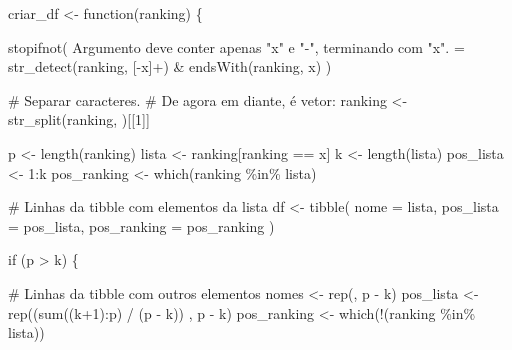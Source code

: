 \documentclass[
  letterpaper,
  DIV=11,
  numbers=noendperiod]{scrreprt}
\newenvironment{Shaded}{\begin{snugshade}}{\end{snugshade}}
\newcommand{\AttributeTok}[1]{\textcolor[rgb]{0.40,0.45,0.13}{#1}}
\newcommand{\CommentTok}[1]{\textcolor[rgb]{0.37,0.37,0.37}{#1}}
\newcommand{\ControlFlowTok}[1]{\textcolor[rgb]{0.00,0.23,0.31}{#1}}
\newcommand{\DecValTok}[1]{\textcolor[rgb]{0.68,0.00,0.00}{#1}}
\newcommand{\FunctionTok}[1]{\textcolor[rgb]{0.28,0.35,0.67}{#1}}
\newcommand{\NormalTok}[1]{\textcolor[rgb]{0.00,0.23,0.31}{#1}}
\newcommand{\OtherTok}[1]{\textcolor[rgb]{0.00,0.23,0.31}{#1}}
\newcommand{\SpecialCharTok}[1]{\textcolor[rgb]{0.37,0.37,0.37}{#1}}
\newcommand{\StringTok}[1]{\textcolor[rgb]{0.13,0.47,0.30}{#1}}
\begin{document}
\begin{Shaded}
\begin{Highlighting}[]
\NormalTok{criar\_df }\OtherTok{\textless{}{-}} \ControlFlowTok{function}\NormalTok{(ranking) \{}
  
  \FunctionTok{stopifnot}\NormalTok{(}
    \StringTok{\textquotesingle{}Argumento deve conter apenas "x" e "{-}", terminando com "x".\textquotesingle{}} \OtherTok{=}
    \FunctionTok{str\_detect}\NormalTok{(ranking, }\StringTok{\textquotesingle{}[{-}x]+\textquotesingle{}}\NormalTok{) }\SpecialCharTok{\&} \FunctionTok{endsWith}\NormalTok{(ranking, }\StringTok{\textquotesingle{}x\textquotesingle{}}\NormalTok{)}
\NormalTok{  )}
  
  \CommentTok{\# Separar caracteres. }
  \CommentTok{\# De agora em diante, é vetor:}
\NormalTok{  ranking }\OtherTok{\textless{}{-}} \FunctionTok{str\_split}\NormalTok{(ranking, }\StringTok{\textquotesingle{}\textquotesingle{}}\NormalTok{)[[}\DecValTok{1}\NormalTok{]]}
  
\NormalTok{  p }\OtherTok{\textless{}{-}} \FunctionTok{length}\NormalTok{(ranking)}
\NormalTok{  lista }\OtherTok{\textless{}{-}}\NormalTok{ ranking[ranking }\SpecialCharTok{==} \StringTok{\textquotesingle{}x\textquotesingle{}}\NormalTok{]}
\NormalTok{  k }\OtherTok{\textless{}{-}} \FunctionTok{length}\NormalTok{(lista)}
\NormalTok{  pos\_lista }\OtherTok{\textless{}{-}} \DecValTok{1}\SpecialCharTok{:}\NormalTok{k}
\NormalTok{  pos\_ranking }\OtherTok{\textless{}{-}} \FunctionTok{which}\NormalTok{(ranking }\SpecialCharTok{\%in\%}\NormalTok{ lista)}
  
  \CommentTok{\# Linhas da tibble com elementos da lista}
\NormalTok{  df }\OtherTok{\textless{}{-}} \FunctionTok{tibble}\NormalTok{(}
    \AttributeTok{nome =}\NormalTok{ lista,}
    \AttributeTok{pos\_lista =}\NormalTok{ pos\_lista,}
    \AttributeTok{pos\_ranking =}\NormalTok{ pos\_ranking}
\NormalTok{  )}
  
  \ControlFlowTok{if}\NormalTok{ (p }\SpecialCharTok{\textgreater{}}\NormalTok{ k) \{}
    
    \CommentTok{\# Linhas da tibble com outros elementos}
\NormalTok{    nomes }\OtherTok{\textless{}{-}} \FunctionTok{rep}\NormalTok{(}\StringTok{\textquotesingle{}{-}\textquotesingle{}}\NormalTok{, p }\SpecialCharTok{{-}}\NormalTok{ k)}
\NormalTok{    pos\_lista }\OtherTok{\textless{}{-}} \FunctionTok{rep}\NormalTok{((}\FunctionTok{sum}\NormalTok{((k}\SpecialCharTok{+}\DecValTok{1}\NormalTok{)}\SpecialCharTok{:}\NormalTok{p) }\SpecialCharTok{/}\NormalTok{ (p }\SpecialCharTok{{-}}\NormalTok{ k)) , p }\SpecialCharTok{{-}}\NormalTok{ k)}
\NormalTok{    pos\_ranking }\OtherTok{\textless{}{-}} \FunctionTok{which}\NormalTok{(}\SpecialCharTok{!}\NormalTok{(ranking }\SpecialCharTok{\%in\%}\NormalTok{ lista))}
    

\end{Highlighting}
\end{Shaded}
\end{document}
